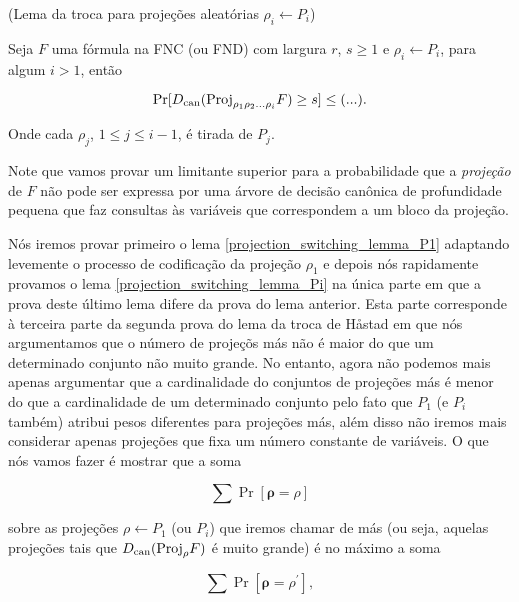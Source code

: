 \begin{lema} (Lema da troca para projeções aleatórias $\rho_{i} \leftarrow P_{i}$) \label{projection_switching_lemma_Pi}

Seja $F$ uma fórmula na FNC (ou FND) com largura $r$, $s \geq 1$ e $\rho_{i} \leftarrow P_{i}$, para algum $i > 1$, então

\begin{equation*}
	\Pr[D_{\text{can}}(\text{Proj}_{\rho_{1}\rho_{2}\dots\rho_{i}}F) \geq s] \leq (...).
\end{equation*} 

Onde cada $\rho_{j}$, $1 \leq j \leq i - 1$, é tirada de $P_{j}$.

\end{lema}

Note que vamos provar um limitante superior para a probabilidade que a \emph{projeção} de $F$ não pode ser expressa por uma árvore de decisão canônica de profundidade pequena que faz consultas às variáveis que correspondem a um bloco da projeção.

Nós iremos provar primeiro o lema \ref{projection_switching_lemma_P1} adaptando levemente o processo de codificação da projeção $\rho_{1}$ e depois nós rapidamente provamos o lema \ref{projection_switching_lemma_Pi} na única parte em que a prova deste último lema difere da prova do lema anterior. Esta parte corresponde à terceira parte da segunda prova do lema da troca de Håstad em que nós argumentamos que o número de projeçõs más não é maior do que um determinado conjunto não muito grande. No entanto, agora não podemos mais apenas argumentar que a cardinalidade do conjuntos de projeções más é menor do que a cardinalidade de um determinado conjunto pelo fato que $P_{1}$ (e $P_{i}$ também) atribui pesos diferentes para projeções más, além disso não iremos mais considerar apenas projeções que fixa um número constante de variáveis. O que nós vamos fazer é mostrar que a soma

\begin{equation*}
	\sum \Pr[\boldsymbol{\rho} = \rho]
\end{equation*}

sobre as projeções $\rho \leftarrow P_{1}$ (ou $P_{i}$) que iremos chamar de más (ou seja, aquelas projeções tais que $D_{\text{can}}(\text{Proj}_{\rho}F)$ é muito grande) é no máximo a soma

\begin{equation*}
	\sum \Pr[\boldsymbol{\rho} = \rho^{\prime}],
\end{equation*}

